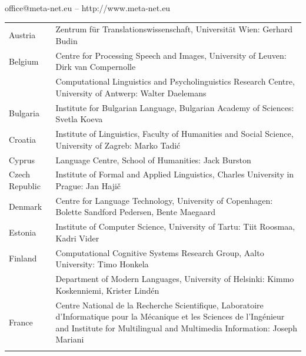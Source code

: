 \vfill
\centerline{office@meta-net.eu -- http://www.meta-net.eu}

\cleardoublepage

\appendix



  
\cleardoublepage

\label{metanetmembers}

\small

\begin{longtable}{@{}lp{137mm}@{}}
Austria & Zentrum für Translationswissenschaft, Universität Wien: Gerhard Budin\\ \addlinespace 
Belgium & Centre for Processing Speech and Images, University of Leuven: Dirk van Compernolle \\ \addlinespace
& Computational Linguistics and Psycholinguistics Research Centre, University of Antwerp: \newline Walter Daelemans\\ \addlinespace
Bulgaria & Institute for Bulgarian Language, Bulgarian Academy of Sciences: Svetla Koeva \\ \addlinespace
Croatia & Institute of Linguistics, Faculty of Humanities and Social Science, University of Zagreb: Marko Tadić \\ \addlinespace
Cyprus & Language Centre, School of Humanities: Jack Burston \\ \addlinespace
Czech Republic & Institute of Formal and Applied Linguistics, Charles University in Prague: Jan Hajič \\ \addlinespace
Denmark & Centre for Language Technology, University of Copenhagen: Bolette Sandford Pedersen, \newline Bente Maegaard\\ \addlinespace
Estonia & Institute of Computer Science, University of Tartu: Tiit Roosmaa, Kadri Vider\\ \addlinespace
Finland & Computational Cognitive Systems Research Group, Aalto University: Timo Honkela\\ \addlinespace
& Department of Modern Languages, University of Helsinki: Kimmo Koskenniemi, Krister Lindén \\ \addlinespace
France & Centre National de la Recherche Scientifique, Laboratoire d'Informatique pour la Mécanique et les Sciences de l'Ingénieur and Institute for Multilingual and Multimedia Information: Joseph Mariani \\ \addlinespace

\end{longtable}

